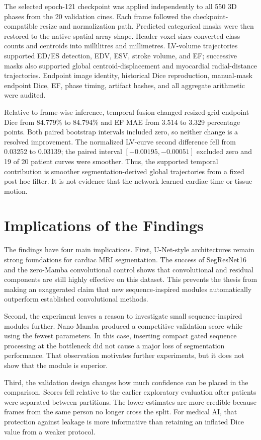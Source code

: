The selected epoch-121 checkpoint was applied independently to all 550 3D phases from the 20 validation cines. Each frame followed the checkpoint-compatible resize and normalization path. Predicted categorical masks were then restored to the native spatial array shape. Header voxel sizes converted class counts and centroids into millilitres and millimetres. LV-volume trajectories supported ED/ES detection, EDV, ESV, stroke volume, and EF; successive masks also supported global centroid-displacement and myocardial radial-distance trajectories. Endpoint image identity, historical Dice reproduction, manual-mask endpoint Dice, EF, phase timing, artifact hashes, and all aggregate arithmetic were audited.

Relative to frame-wise inference, temporal fusion changed resized-grid endpoint Dice from 84.779\% to 84.794\% and EF MAE from 3.514 to 3.329 percentage points. Both paired bootstrap intervals included zero, so neither change is a resolved improvement. The normalized LV-curve second difference fell from 0.03252 to 0.03139; the paired interval $[-0.00195,-0.00051]$ excluded zero and 19 of 20 patient curves were smoother. Thus, the supported temporal contribution is smoother segmentation-derived global trajectories from a fixed post-hoc filter. It is not evidence that the network learned cardiac time or tissue motion.

\section{Implications of the Findings}
The findings have four main implications. First, U-Net-style architectures remain strong foundations for cardiac MRI segmentation. The success of SegResNet16 and the zero-Mamba convolutional control shows that convolutional and residual components are still highly effective on this dataset. This prevents the thesis from making an exaggerated claim that new sequence-inspired modules automatically outperform established convolutional methods.

Second, the experiment leaves a reason to investigate small sequence-inspired modules further. Nano-Mamba produced a competitive validation score while using the fewest parameters. In this case, inserting compact gated sequence processing at the bottleneck did not cause a major loss of segmentation performance. That observation motivates further experiments, but it does not show that the module is superior.

Third, the validation design changes how much confidence can be placed in the comparison. Scores fell relative to the earlier exploratory evaluation after patients were separated between partitions. The lower estimates are more credible because frames from the same person no longer cross the split. For medical AI, that protection against leakage is more informative than retaining an inflated Dice value from a weaker protocol.

